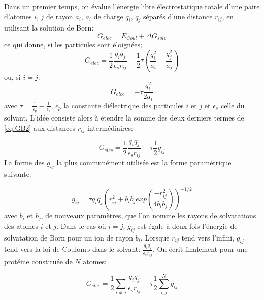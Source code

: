 Dans un premier temps, on évalue l'énergie libre électrostatique totale d'une paire d'atomes $i$, $j$ de rayon $a_i$, $a_i$ de charge $q_i$, $q_j$ séparés d'une distance $r_{ij}$, en utilisant la solution de Born:
\begin{equation}
  \label{eq:GB}
  G_{elec} =  E_{Coul} + \Delta G_{solv}
\end{equation}
ce qui donne, si les particules sont éloignées;
\begin{equation}
  \label{eq:GB2}
  G_{elec} =  \frac{1}{2}  \frac{q_iq_j}{\epsilon_s r_{ij}} - \frac{1}{2}  \tau ( \frac{q_i^2}{a_i} +  \frac{q_j^2}{a_j})  
\end{equation}
ou, si $i=j$:
\begin{equation}
  G_{elec} = - \tau \frac{q_i^2}{2a_i}
\end{equation}
avec $ \tau = \frac{1}{\epsilon_p} - \frac{1}{\epsilon_s}$, $\epsilon_p$ la constante diélectrique des particules $i$ et $j$ et $\epsilon_s$ celle du solvant. L'idée consiste alors à étendre la somme des deux derniers termes de \ref{eq:GB2} aux distances $r_{ij}$ intermédiaires:

\begin{equation}
  G_{elec} = \frac{1}{2} \frac{q_iq_j}{\epsilon_s r_{ij}} - \tau \frac{1}{2} g_{ij}
\end{equation}
La forme des $g_{ij}$ la plus communément utilisée est la forme paramétrique suivante:


\begin{equation}
  \label{eq:GBg}
  g_{ij}= \tau q_iq_j (r^2_{ij} + b_ib_j exp(\frac{-r^2_{ij}}{4b_ib_j}))^{-1/2} 
\end{equation}
avec $b_i$ et $b_j$, de nouveaux paramètres, que l'on nomme les rayons de solvatations des atomes $i$ et $j$. Dans le cas où $i=j$, $g_{ij}$ est égale à deux fois l'énergie de solvatation de Born pour un ion de rayon $b_i$. Lorsque $r_{ij}$ tend vers l'infini, $g_{ij}$ tend vers la loi de Coulomb dans le solvant: $\frac{q_iq_j}{\epsilon_s r_{ij}}$. On écrit finalement pour une protéine constituée de $N$ atomes:

\begin{equation}
  G_{elec} = \frac{1}{2} \sum_{i \neq j} \frac{q_iq_j}{\epsilon_sr_{ij}} - \tau \frac{1}{2} \sum_{i,j}^N g_{ij}
\end{equation}


